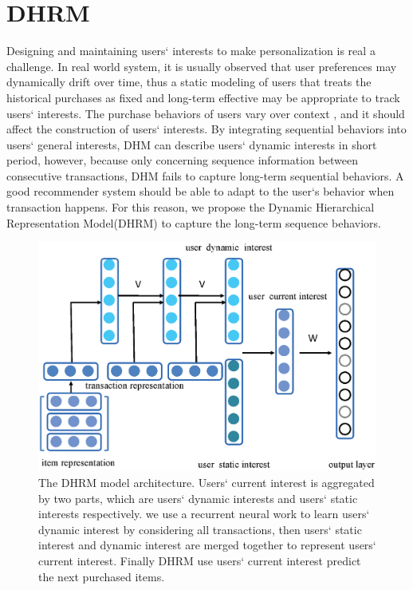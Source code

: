 \documentclass[10pt,journal,compsoc]{IEEEtran}
\begin{document}
\section{DHRM}

Designing and maintaining users` interests to make personalization is real a challenge. In real world system, it is usually observed that user preferences may dynamically drift over time, thus a static modeling of users that treats the historical purchases as fixed and long-term effective may be appropriate to track users` interests.  The purchase behaviors of users vary over context , and it should affect the construction of users` interests. By integrating sequential behaviors into users` general interests, DHM can describe users` dynamic interests in short period, however, because only concerning sequence information between consecutive transactions, DHM fails to capture long-term sequential behaviors. A good recommender system should be able to adapt to the user`s behavior when transaction happens. For this reason, we propose the Dynamic Hierarchical Representation Model(DHRM) to capture the long-term sequence behaviors.
\begin{figure}[bpht]
\centering
\includegraphics[scale=0.45,viewport=70 50 600 500,clip=true]{DHM.eps}
\caption{\label{fig:hrm}The DHRM model architecture. Users` current interest is aggregated by two parts, which are users` dynamic interests and users` static interests respectively. we use a recurrent neural work to learn users` dynamic interest by considering all transactions, then users` static interest and dynamic interest are merged together to represent users` current interest. Finally DHRM use users` current interest predict the next purchased items.}
\end{figure}
\end{document}

